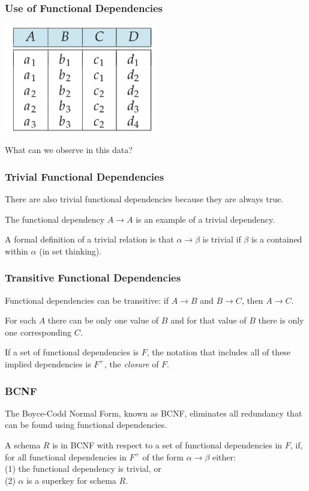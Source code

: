 \begin{frame}
\frametitle{Use of Functional Dependencies}

\begin{center}
\includegraphics[width=0.5\textwidth]{images/fd-1}
\end{center}

What can we observe in this data?

\end{frame}



\begin{frame}
\frametitle{Trivial Functional Dependencies}

There are also \alert{trivial} functional dependencies because they are always true.

The functional dependency $A \rightarrow A$ is an example of a trivial dependency. 

A formal definition of a trivial relation is that $\alpha \rightarrow \beta$ is trivial if $\beta$ is a contained within $\alpha$ (in set thinking).

\end{frame}


\begin{frame}
\frametitle{Transitive Functional Dependencies}

Functional dependencies can be transitive: if $A \rightarrow B$ and $B \rightarrow C$, then $A \rightarrow C$. 

For each $A$ there can be only one value of $B$ and for that value of $B$ there is only one corresponding $C$. 

If a set of functional dependencies is $F$, the notation that includes all of these implied dependencies is $F^{+}$, the \textit{closure} of $F$.


\end{frame}



\begin{frame}
\frametitle{BCNF}

The \alert{Boyce-Codd Normal Form}, known as BCNF, eliminates all redundancy that can be found using functional dependencies.

A schema $R$ is in BCNF with respect to a set of functional dependencies in $F$, if, for all functional dependencies in $F^{+}$ of the form $\alpha \rightarrow \beta$ either: \\
\quad (1) the functional dependency is trivial, or\\
\quad (2) $\alpha$ is a superkey for schema $R$.


\end{frame}


